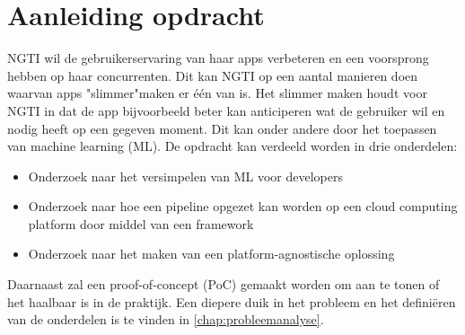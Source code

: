 \section{Aanleiding opdracht}\label{sec:ch1-aanleiding-opdracht}
NGTI wil de gebruikerservaring van haar apps verbeteren en een voorsprong hebben op haar concurrenten. Dit kan NGTI op een aantal manieren doen waarvan apps "slimmer"\space maken er één van is. Het slimmer maken houdt voor NGTI in dat de app bijvoorbeeld beter kan anticiperen wat de gebruiker wil en nodig heeft op een gegeven moment. Dit kan onder andere door het toepassen van machine learning (ML). De opdracht kan verdeeld worden in drie onderdelen:

\begin{itemize}
  \item Onderzoek naar het versimpelen van ML voor developers
  \item Onderzoek naar hoe een pipeline opgezet kan worden op een cloud computing platform door middel van een framework
  \item Onderzoek naar het maken van een platform-agnostische oplossing
\end{itemize}

Daarnaast zal een proof-of-concept (PoC) gemaakt worden om aan te tonen of het haalbaar is in de praktijk. Een diepere duik in het probleem en het definiëren van de onderdelen is te vinden in \autoref{chap:probleemanalyse}.